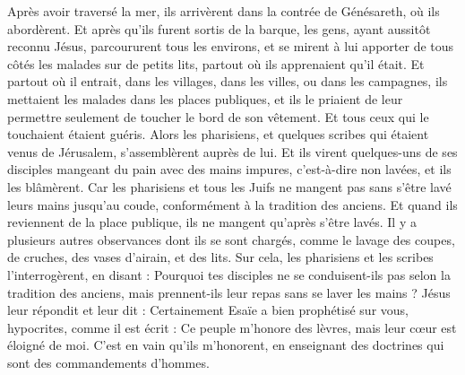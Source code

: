 \begin{multicols}{2}
Après avoir traversé la mer, ils arrivèrent dans la contrée de Génésareth, où ils abordèrent.
Et après qu’ils furent sortis de la barque, les gens, ayant aussitôt reconnu Jésus,
parcoururent tous les environs, et se mirent à lui apporter de tous côtés les malades sur de petits lits, partout où ils apprenaient qu'il était.
Et partout où il entrait, dans les villages, dans les villes, ou dans les campagnes, ils mettaient les malades dans les places publiques, et ils le priaient de leur permettre seulement de toucher le bord de son vêtement. Et tous ceux qui le touchaient étaient guéris.
\VerseOne{}Alors les pharisiens, et quelques scribes qui étaient venus de Jérusalem, s'assemblèrent auprès de lui.
Et ils virent quelques-uns de ses disciples mangeant du pain avec des mains impures, c'est-à-dire non lavées, et ils les blâmèrent.
Car les pharisiens et tous les Juifs ne mangent pas sans s’être lavé leurs mains jusqu’au coude, conformément à la tradition des anciens.
Et quand ils reviennent de la place publique, ils ne mangent qu’après s’être lavés. Il y a plusieurs autres observances dont ils se sont chargés, comme le lavage des coupes, de cruches, des vases d'airain, et des lits.
Sur cela, les pharisiens et les scribes l'interrogèrent, en disant : Pourquoi tes disciples ne se conduisent-ils pas selon la tradition des anciens, mais prennent-ils leur repas sans se laver les mains ?
Jésus leur répondit et leur dit : Certainement Esaïe a bien prophétisé sur vous, hypocrites, comme il est écrit : Ce peuple m'honore des lèvres, mais leur cœur est éloigné de moi.
C’est en vain qu’ils m'honorent, en enseignant des doctrines qui sont des commandements d'hommes.

\end{multicols}
